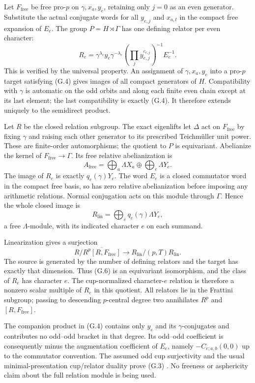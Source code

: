 \documentclass[11pt,a4paper]{article}
\theoremstyle{definition}
\begin{document}
Let $F_{\mathrm{free}}$ be free pro-$p$ on $\gamma,x_a,y_e$, retaining only $j=0$ as an even generator. Substitute the actual conjugate words for all $y_{e,j}$ and $x_{a,t}$ in the compact free expansion of $E_e$. The group $P=H\rtimes\Gamma$ has one defining relator per even character:
\[
 R_e=\gamma^{\lambda_e}y_e\gamma^{-\lambda_e}
       \left(\prod_jy_{e,j}^{c_{e,j}}\right)^{-1}E_e^{-1}.       \tag{G.4}
\]
This is verified by the universal property. An assignment of $\gamma,x_a,y_e$ into a pro-$p$ target satisfying (G.4) gives images of all compact generators of $H$. Compatibility with $\gamma$ is automatic on the odd orbits and along each finite even chain except at its last element; the last compatibility is exactly (G.4). It therefore extends uniquely to the semidirect product.

Let $R$ be the closed relation subgroup. The exact eigenlifts let $\Delta$ act on $F_{\mathrm{free}}$ by fixing $\gamma$ and raising each other generator to its prescribed Teichm\"uller unit power. These are finite-order automorphisms; the quotient to $P$ is equivariant. Abelianize the kernel of $F_{\mathrm{free}}\to\Gamma$. Its free relative abelianization is
\[
 A_{\mathrm{free}}=
   \bigoplus_a\Lambda X_a\oplus\bigoplus_e\Lambda Y_e.
\]
The image of $R_e$ is exactly $q_e(\gamma)Y_e$. The word $E_e$ is a closed commutator word in the compact free basis, so has zero relative abelianization before imposing any arithmetic relations. Normal conjugation acts on this module through $\Gamma$. Hence the whole closed image is
\[
 R_{\mathrm{lin}}=\bigoplus_eq_e(\gamma)\Lambda Y_e,             \tag{G.5}
\]
a free $\Lambda$-module, with its indicated character $e$ on each summand.

Linearization gives a surjection
\[
 R/\overline{R^p[R,F_{\mathrm{free}}]}
       \longrightarrow R_{\mathrm{lin}}/(p,T)R_{\mathrm{lin}}.  \tag{G.6}
\]
The source is generated by the number of defining relators and the target has exactly that dimension. Thus (G.6) is an equivariant isomorphism, and the class of $R_e$ has character $e$. The cup-normalized character-$e$ relation is therefore a nonzero scalar multiple of $R_e$ in this quotient. All relators lie in the Frattini subgroup; passing to descending $p$-central degree two annihilates $R^p$ and $[R,F_{\mathrm{free}}]$.

The companion product in (G.4) contains only $y_e$ and its $\gamma$-conjugates and contributes no odd--odd bracket in that degree. Its odd--odd coefficient is consequently minus the augmentation coefficient of $E_e$, namely $-C_{e;a,b}(0,0)$ up to the commutator convention. The assumed odd cup surjectivity and the usual minimal-presentation cup/relator duality prove (G.3) \cite[\S8, pp.~21--23]{McCallumSharifi2003}. No freeness or asphericity claim about the full relation module is being used.
\end{document}

